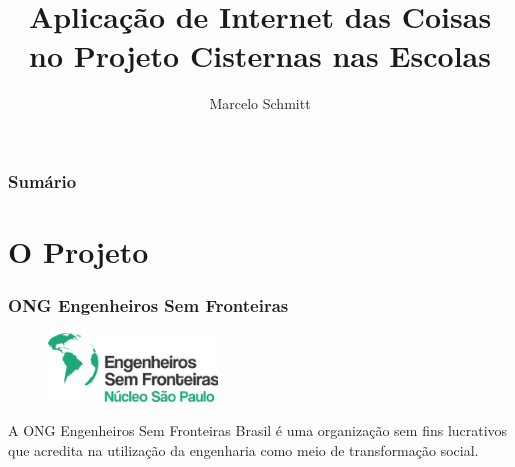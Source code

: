 \documentclass{beamer}
\title[Energia em IoT]{Aplicação de Internet das Coisas no Projeto Cisternas nas Escolas}
\author[Marcelo Schmitt]{Marcelo Schmitt}
\institute[IME-USP]{Universidade de São Paulo}
\date{}
\begin{document}
\begin{frame}
 \maketitle
\end{frame}

\begin{frame}
\frametitle{Sumário}
 \tableofcontents
\end{frame}

\section{O Projeto}
\begin{frame}
\frametitle{ONG Engenheiros Sem Fronteiras}
\begin{minipage}{\textwidth}

\begin{figure}
	\vspace{-10pt}
	\begin{center}
		\includegraphics[width=0.4\textwidth]{eng_sem_front.png}
	\end{center}
\end{figure}

A ONG Engenheiros Sem Fronteiras Brasil é uma organização sem fins lucrativos que acredita na utilização da engenharia como meio de transformação social.

\end{minipage}
\end{frame}
\end{document}
